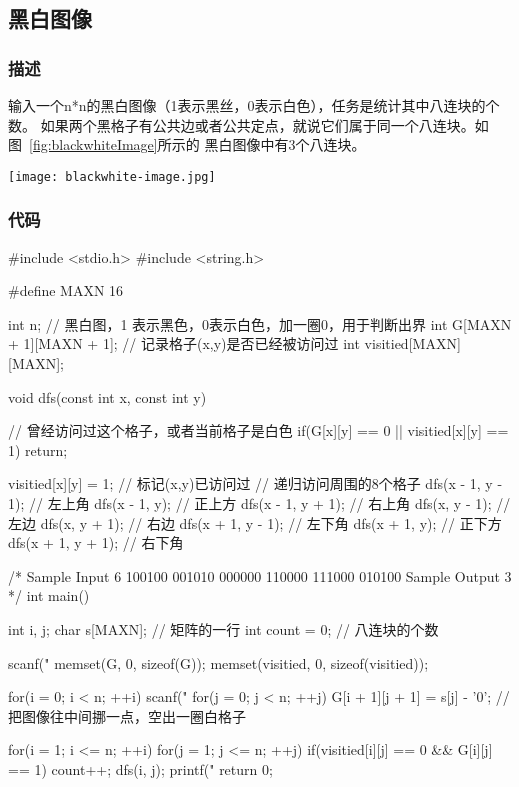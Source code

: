 \subsection{黑白图像}

\subsubsection{描述}
输入一个n*n的黑白图像（1表示黑丝，0表示白色），任务是统计其中八连块的个数。
如果两个黑格子有公共边或者公共定点，就说它们属于同一个八连块。如图~\ref{fig:blackwhiteImage}所示的
黑白图像中有3个八连块。

\begin{center}
\texttt{[image: blackwhite-image.jpg]}\\
\label{fig:blackwhiteImage}
\end{center}

\subsubsection{代码}
\begin{Codex}[label=blackwhite_image.c]
#include <stdio.h>
#include <string.h>

#define MAXN 16

int n;
// 黑白图，1 表示黑色，0表示白色，加一圈0，用于判断出界
int G[MAXN + 1][MAXN + 1];
// 记录格子(x,y)是否已经被访问过
int visitied[MAXN][MAXN];

void dfs(const int x, const int y) {
    // 曾经访问过这个格子，或者当前格子是白色
    if(G[x][y] == 0 || visitied[x][y] == 1)  return;
    
    visitied[x][y] = 1; // 标记(x,y)已访问过
    // 递归访问周围的8个格子
    dfs(x - 1, y - 1); // 左上角
    dfs(x - 1, y); // 正上方
    dfs(x - 1, y + 1); // 右上角
    dfs(x, y - 1); // 左边
    dfs(x, y + 1); // 右边
    dfs(x + 1, y - 1); // 左下角
    dfs(x + 1, y); // 正下方
    dfs(x + 1, y + 1); // 右下角
}

/*
Sample Input
6
100100
001010
000000
110000
111000
010100
Sample Output
3
*/
int main() {
    int i, j;
    char s[MAXN]; // 矩阵的一行
    int count = 0; // 八连块的个数

    scanf("%
    memset(G, 0, sizeof(G));
    memset(visitied, 0, sizeof(visitied));

    for(i = 0; i < n; ++i) {
        scanf("%
        for(j = 0; j < n; ++j) {
            G[i + 1][j + 1] = s[j] - '0'; // 把图像往中间挪一点，空出一圈白格子
        }
    }


    for(i = 1; i <= n; ++i) {
        for(j = 1; j <= n; ++j) {
            if(visitied[i][j] == 0 && G[i][j] == 1) {
                count++;
                dfs(i, j);
            }
        }
    }
    printf("%
    return 0;
}
\end{Codex}

